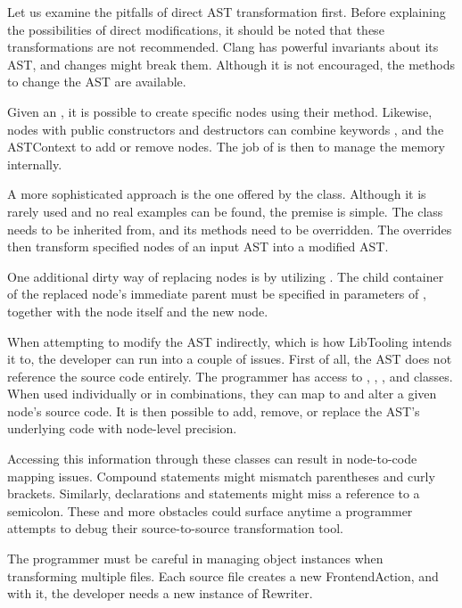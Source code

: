 Let us examine the pitfalls of direct AST transformation first. 
Before explaining the possibilities of direct modifications, it 
should be noted that these transformations are not recommended. 
Clang has powerful invariants about its AST, and changes might 
break them. 
Although it is not encouraged, the methods to change the AST 
are available.

Given an , it is possible to create specific nodes
using their  method. 
Likewise, nodes with public constructors and destructors can combine 
keywords ,  and the ASTContext 
to add or remove nodes. 
The job of  is then to manage the memory internally.

A more sophisticated approach is the one offered 
by the  class. 
Although it is rarely used and no real examples can be found, 
the premise is simple. 
The  class needs to be inherited from, 
and its  methods need to be overridden. 
The overrides then transform specified nodes of an input AST 
into a modified AST.

One additional dirty way of replacing nodes is by utilizing 
. 
The child container of the replaced node's immediate parent must be 
specified in parameters of , together with 
the node itself and the new node.

When attempting to modify the AST indirectly, which is how LibTooling 
intends it to, the developer can run into a couple of issues. 
First of all, the AST does not reference the source code entirely. 
The programmer has access to , ,
, and  classes. 
When used individually or in combinations, they can map to and alter 
a given node's source code.
It is then possible to add, remove, or replace the AST's underlying 
code with node-level precision.

Accessing this information through these classes can result in 
node-to-code mapping issues. 
Compound statements might mismatch parentheses and curly brackets. 
Similarly, declarations and statements might miss a reference to 
a semicolon. 
These and more obstacles could surface anytime a programmer attempts 
to debug their source-to-source transformation tool. 

The programmer must be careful in managing object instances when 
transforming multiple files. 
Each source file creates a new FrontendAction, and with it, 
the developer needs a new instance of Rewriter.

